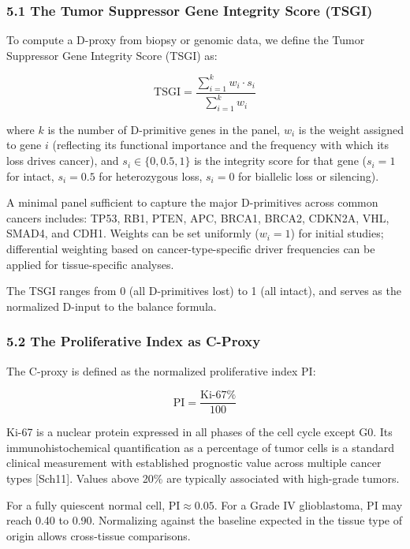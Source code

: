 \documentclass[
  11pt,
  letterpaper,
]{article}
\begin{document}
\subsubsection{5.1 The Tumor Suppressor Gene Integrity Score
(TSGI)}\label{the-tumor-suppressor-gene-integrity-score-tsgi}

To compute a D-proxy from biopsy or genomic data, we define the Tumor
Suppressor Gene Integrity Score (TSGI) as:

\[\text{TSGI} = \frac{\sum_{i=1}^{k} w_i \cdot s_i}{\sum_{i=1}^{k} w_i}\]

where \(k\) is the number of D-primitive genes in the panel, \(w_i\) is
the weight assigned to gene \(i\) (reflecting its functional importance
and the frequency with which its loss drives cancer), and
\(s_i \in \{0, 0.5, 1\}\) is the integrity score for that gene
(\(s_i = 1\) for intact, \(s_i = 0.5\) for heterozygous loss,
\(s_i = 0\) for biallelic loss or silencing).

A minimal panel sufficient to capture the major D-primitives across
common cancers includes: TP53, RB1, PTEN, APC, BRCA1, BRCA2, CDKN2A,
VHL, SMAD4, and CDH1. Weights can be set uniformly (\(w_i = 1\)) for
initial studies; differential weighting based on cancer-type-specific
driver frequencies can be applied for tissue-specific analyses.

The TSGI ranges from 0 (all D-primitives lost) to 1 (all intact), and
serves as the normalized D-input to the balance formula.

\subsubsection{5.2 The Proliferative Index as
C-Proxy}\label{the-proliferative-index-as-c-proxy}

The C-proxy is defined as the normalized proliferative index
\(\text{PI}\):

\[\text{PI} = \frac{\text{Ki-67\%}}{100}\]

Ki-67 is a nuclear protein expressed in all phases of the cell cycle
except G0. Its immunohistochemical quantification as a percentage of
tumor cells is a standard clinical measurement with established
prognostic value across multiple cancer types {[}Sch11{]}. Values above
20\% are typically associated with high-grade tumors.

For a fully quiescent normal cell, \(\text{PI} \approx 0.05\). For a
Grade IV glioblastoma, \(\text{PI}\) may reach 0.40 to 0.90. Normalizing
against the baseline expected in the tissue type of origin allows
cross-tissue comparisons.
\end{document}
